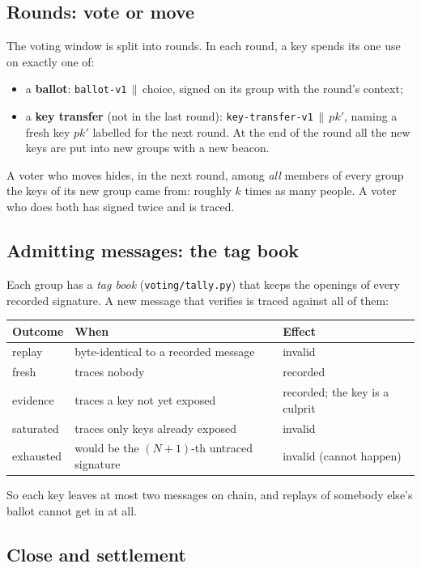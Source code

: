 \documentclass[11pt,a4paper]{article}
\newcommand{\pk}{\mathit{pk}}
\newcommand{\file}[1]{\texttt{#1}}
\theoremstyle{definition}
\begin{document}
\subsection{Rounds: vote or move}

The voting window is split into rounds. In each round, a key spends its one
use on exactly one of:
\begin{itemize}[leftmargin=*]
  \item a \textbf{ballot}: \texttt{ballot-v1}$\,\|\,$choice, signed on its
    group with the round's context;
  \item a \textbf{key transfer} (not in the last round):
    \texttt{key-transfer-v1}$\,\|\,\pk'$, naming a fresh key $\pk'$ labelled
    for the next round. At the end of the round all the new keys are put
    into new groups with a new beacon.
\end{itemize}
A voter who moves hides, in the next round, among \emph{all} members of
every group the keys of its new group came from: roughly $k$ times as
many people. A voter who does both has signed twice and is traced.

\subsection{Admitting messages: the tag book}

Each group has a \emph{tag book} (\file{voting/tally.py}) that keeps the
openings of every recorded signature. A new message that verifies is
traced against all of them:
\begin{center}
\small
\begin{tabular}{lll}
\toprule
Outcome & When & Effect \\
\midrule
replay & byte-identical to a recorded message & invalid \\
fresh & traces nobody & recorded \\
evidence & traces a key not yet exposed & recorded; the key is a culprit \\
saturated & traces only keys already exposed & invalid \\
exhausted & would be the $(N{+}1)$-th untraced signature & invalid (cannot happen) \\
\bottomrule
\end{tabular}
\end{center}
So each key leaves at most two messages on chain, and replays of somebody
else's ballot cannot get in at all.

\subsection{Close and settlement}
\end{document}
